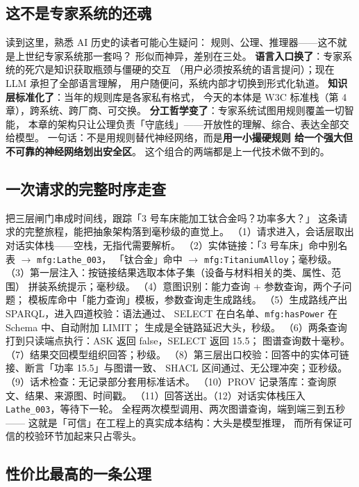 \subsection{这不是专家系统的还魂}

读到这里，熟悉 AI 历史的读者可能心生疑问：
规则、公理、推理器——这不就是上世纪专家系统那一套吗？
形似而神异，差别在三处。
\textbf{语言入口换了}：专家系统的死穴是知识获取瓶颈与僵硬的交互
（用户必须按系统的语言提问）；现在 LLM 承担了全部语言理解，
用户随便问，系统内部才切换到形式化轨道。
\textbf{知识层标准化了}：当年的规则库是各家私有格式，
今天的本体是 W3C 标准栈（第 4 章），跨系统、跨厂商、可交换。
\textbf{分工哲学变了}：专家系统试图用规则覆盖一切智能，
本章的架构只让公理负责「守底线」——开放性的理解、综合、表达全部交给模型。
一句话：不是用规则替代神经网络，而是\textbf{用一小撮硬规则
给一个强大但不可靠的神经网络划出安全区}。
这个组合的两端都是上一代技术做不到的。

\subsection{一次请求的完整时序走查}

把三层闸门串成时间线，跟踪「3 号车床能加工钛合金吗？功率多大？」
这条请求的完整旅程，能把抽象架构落到毫秒级的直觉上。
（1）请求进入，会话层取出对话实体栈——空栈，无指代需要解析。
（2）实体链接：「3 号车床」命中别名表 \(\rightarrow\) \texttt{mfg:Lathe\_003}，
「钛合金」命中 \(\rightarrow\) \texttt{mfg:TitaniumAlloy}；毫秒级。
（3）第一层注入：按链接结果选取本体子集（设备与材料相关的类、属性、范围）
拼装系统提示；毫秒级。
（4）意图识别：能力查询 + 参数查询，两个子问题；
模板库命中「能力查询」模板，参数查询走生成路线。
（5）生成路线产出 SPARQL，进入四道校验：语法通过、
SELECT 在白名单、\texttt{mfg:hasPower} 在 Schema 中、自动附加 LIMIT；
生成是全链路延迟大头，秒级。
（6）两条查询打到只读端点执行：ASK 返回 false，SELECT 返回 15.5；
图谱查询数十毫秒。
（7）结果交回模型组织回答；秒级。
（8）第三层出口校验：回答中的实体可链接、断言「功率 15.5」与图谱一致、
SHACL 区间通过、无公理冲突；亚秒级。
（9）话术检查：无记录部分套用标准话术。
（10）PROV 记录落库：查询原文、结果、来源图、时间戳。
（11）回答送出。（12）对话实体栈压入 \texttt{Lathe\_003}，等待下一轮。
全程两次模型调用、两次图谱查询，端到端三到五秒——
这就是「可信」在工程上的真实成本结构：大头是模型推理，
而所有保证可信的校验环节加起来只占零头。

\subsection{性价比最高的一条公理}


